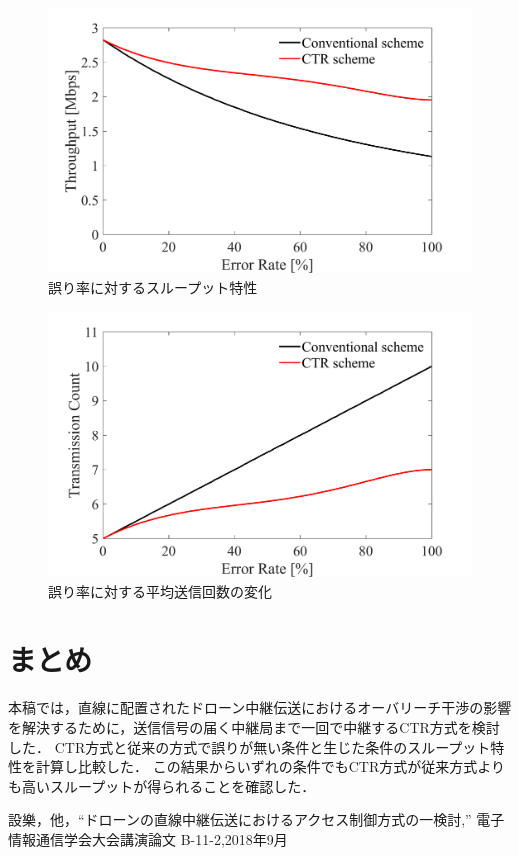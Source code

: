 \documentclass[a4paper,10pt]{ltjsarticle}
\begin{document}
\begin{figure}[H]
  \centering
  \includegraphics[width=\linewidth]{throughput_probabilistic_retry_v3.pdf} 
  \caption{誤り率に対するスループット特性}
  \label{fig:throughput_v3} 
\end{figure}
\begin{figure}[H]
  \centering
  \includegraphics[width=\linewidth]{throughput_probabilistic_retry_v3.1.pdf} 
  \caption{誤り率に対する平均送信回数の変化}
  \label{fig:throughput_v3.1} 
\end{figure}

\section{まとめ}
本稿では，直線に配置されたドローン中継伝送におけるオーバリーチ干渉の影響を解決するために，送信信号の届く中継局まで一回で中継するCTR方式を検討した．
CTR方式と従来の方式で誤りが無い条件と生じた条件のスループット特性を計算し比較した．
この結果からいずれの条件でもCTR方式が従来方式よりも高いスループットが得られることを確認した．

\begin{thebibliography}{99}
  設樂，他，“ドローンの直線中継伝送におけるアクセス制御方式の一検討,” 電子情報通信学会大会講演論文 B-11-2,2018年9月
\end{thebibliography}

%
\end{document}
